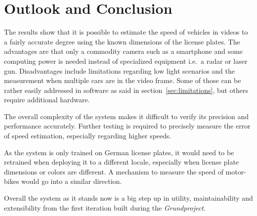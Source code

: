 
\chapter{Outlook and Conclusion} \label{ch:outlook}

The results show that it is possible to estimate the speed of vehicles in videos to a fairly accurate degree using the known dimensions of the license plates.
The advantages are that only a commodity camera such as a smartphone and some computing power is needed instead of specialized equipment i.e.\ a radar or laser gun.
Disadvantages include limitations regarding low light scenarios and the measurement when multiple cars are in the video frame.
Some of those can be rather easily addressed in software as said in section~\ref{sec:limitations}, but others require additional hardware.

The overall complexity of the system makes it difficult to verify its precision and performance accurately.
Further testing is required to precisely measure the error of speed estimation, especially regarding higher speeds.

As the system is only trained on German license plates, it would need to be retrained when deploying it to a different locale, especially when license plate dimensions or colors are different.
A mechanism to measure the speed of motor-bikes would go into a similar direction.

Overall the system as it stands now is a big step up in utility, maintainability and extensibility from the first iteration built during the \textit{Grundproject}.
